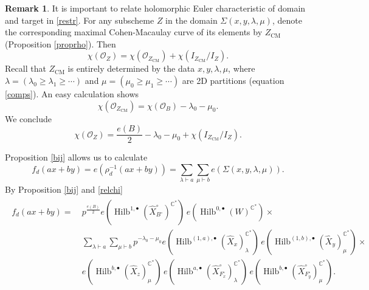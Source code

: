 \documentclass{amsart}
\theoremstyle{definition}
\newtheorem{remark}[theorem]{Remark}
\newcommand{\CC} {\mathbb{C}}          %
\renewcommand{\O}{\mathcal{O}}
\newcommand{\Hilb}{\operatorname{Hilb}}
\newcommand{\CM}{\operatorname{CM}}
\newcommand{\Xhat}{\widehat{X}}
\begin{document}
\begin{remark}
It is important to relate holomorphic Euler characteristic of domain and target in \eqref{restr}. For any subscheme $Z$ in the domain $\Sigma(x,y,\lambda,\mu)$, denote the corresponding maximal Cohen-Macaulay curve of its elements by $Z_{\CM}$ (Proposition \ref{proprho}). Then
$$
\chi(\O_Z) = \chi(\O_{Z_{\CM}}) + \chi(I_{Z_{\CM}} / I_{Z}).
$$ 
Recall that $Z_{\CM}$ is entirely determined by the data $x,y, \lambda, \mu$, where $\lambda = (\lambda_0 \geq \lambda_1 \geq \cdots)$ and $\mu = (\mu_0 \geq \mu_1 \geq \cdots)$ are 2D partitions (equation \eqref{comps}). An easy calculation shows 
$$
\chi(\O_{Z_{\CM}}) = \chi(\O_B) - \lambda_0 - \mu_0.
$$
We conclude
\begin{equation} \label{relchi}
\chi(\O_Z) = \frac{e(B)}{2} - \lambda_0 - \mu_0 + \chi(I_{Z_{\CM}} / I_{Z}).
\end{equation}
\end{remark}

Proposition \ref{bij} allows us to calculate 
$$
f_d(ax+by) = e(\rho_{d}^{-1}(ax+by)) = \sum_{\lambda \vdash a} \sum_{\mu \vdash b} e(\Sigma(x,y,\lambda,\mu)).
$$
By Proposition \ref{bij} and \eqref{relchi} 
\begin{align}
\begin{split} \label{fdintermediate}
f_d(ax+by) = \ &p^{\frac{e(B)}{2}} e(\Hilb^{1,\bullet}(\Xhat ^{\circ}_{B^{\circ}})^{\CC^*}) \, e(\Hilb^{0,\bullet}(W)^{\CC^*}) \times \\
&\sum_{\lambda \vdash a} \sum_{\mu \vdash b} p^{- \lambda_0 - \mu_0 } e(\Hilb^{(1,a),\bullet}(\Xhat _{x})_{\lambda}^{\CC^*}) \, e(\Hilb^{(1,b),\bullet}(\Xhat _{y})_{\mu}^{\CC^*}) \times \\
&e(\Hilb^{b,\bullet}(\Xhat _{z})_{\mu}^{\CC^*}) \, e(\Hilb^{a,\bullet}(\Xhat ^{\circ}_{F_{x}^{\circ}})_{\lambda}^{\CC^*}) \, e(\Hilb^{b,\bullet}(\Xhat ^{\circ}_{F_{y}^{\circ}})_{\mu}^{\CC^*}).
\end{split}
\end{align}
\end{document}
